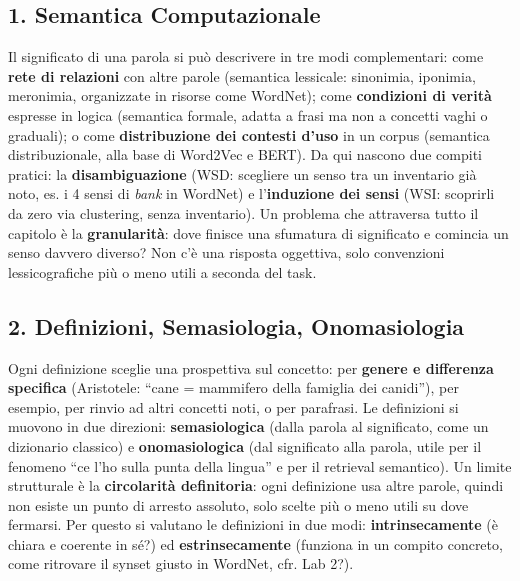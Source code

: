 \documentclass[11pt,a4paper]{article}
\begin{document}
\subsection*{1. Semantica Computazionale}
Il significato di una parola si pu\`o descrivere in tre modi complementari: come \textbf{rete di relazioni} con altre parole (semantica lessicale: sinonimia, iponimia, meronimia, organizzate in risorse come WordNet); come \textbf{condizioni di verit\`a} espresse in logica (semantica formale, adatta a frasi ma non a concetti vaghi o graduali); o come \textbf{distribuzione dei contesti d'uso} in un corpus (semantica distribuzionale, alla base di Word2Vec e BERT). Da qui nascono due compiti pratici: la \textbf{disambiguazione} (WSD: scegliere un senso tra un inventario gi\`a noto, es. i 4 sensi di \emph{bank} in WordNet) e l'\textbf{induzione dei sensi} (WSI: scoprirli da zero via clustering, senza inventario). Un problema che attraversa tutto il capitolo \`e la \textbf{granularit\`a}: dove finisce una sfumatura di significato e comincia un senso davvero diverso? Non c'\`e una risposta oggettiva, solo convenzioni lessicografiche pi\`u o meno utili a seconda del task.

\subsection*{2. Definizioni, Semasiologia, Onomasiologia}
Ogni definizione sceglie una prospettiva sul concetto: per \textbf{genere e differenza specifica} (Aristotele: ``cane = mammifero della famiglia dei canidi''), per esempio, per rinvio ad altri concetti noti, o per parafrasi. Le definizioni si muovono in due direzioni: \textbf{semasiologica} (dalla parola al significato, come un dizionario classico) e \textbf{onomasiologica} (dal significato alla parola, utile per il fenomeno ``ce l'ho sulla punta della lingua'' e per il retrieval semantico). Un limite strutturale \`e la \textbf{circolarit\`a definitoria}: ogni definizione usa altre parole, quindi non esiste un punto di arresto assoluto, solo scelte pi\`u o meno utili su dove fermarsi. Per questo si valutano le definizioni in due modi: \textbf{intrinsecamente} (\`e chiara e coerente in s\'e?) ed \textbf{estrinsecamente} (funziona in un compito concreto, come ritrovare il synset giusto in WordNet, cfr. Lab 2?).
\end{document}
